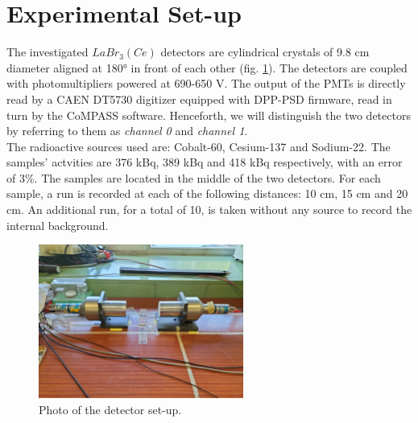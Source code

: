 \section{Experimental Set-up}
\label{sec:setup}

The investigated $LaBr_3(Ce)$ detectors are cylindrical crystals of 9.8 cm diameter aligned at 180° in front of each other (fig. \ref{fig:setup}). The detectors are coupled with photomultipliers powered at 690-650 V. The output of the PMTs is directly read by a CAEN DT5730 digitizer equipped with DPP-PSD firmware, read in turn by the CoMPASS software. Henceforth, we will distinguish the two detectors by referring to them as \emph{channel 0} and \emph{channel 1}. \\

The radioactive sources used are: Cobalt-60, Cesium-137 and Sodium-22. The samples' actvities are 376 kBq, 389 kBq and 418 kBq respectively, with an error of 3\%. The samples are located in the middle of the two detectors. 
For each sample, a run is recorded at each of the following distances: 10 cm, 15 cm and 20 cm. An additional run, for a total of 10, is taken without any source to record the internal background.
	
\begin{figure}[h!]
\centering
\includegraphics[width=0.6\textwidth]{Images/lab/Calibration.jpeg}
\caption{Photo of the detector set-up.}
\label{fig:setup}
\end{figure}